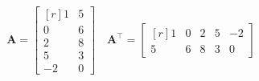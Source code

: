 \documentclass[12 pt]{slides}
\begin{document}
\begingroup
\[\textbf{A} = \begin{bmatrix*}[r]1 & 5\\0 & 6\\2 & 8\\5 & 3\\-2 & 0\end{bmatrix*}
	\quad \textbf{A}^{\intercal} = \begin{bmatrix*}[r]1 & 0 & 2 & 5 & -2\\5 & 6 & 8 & 3 & 0
    \end{bmatrix*}\]
\endgroup
\end{document}
